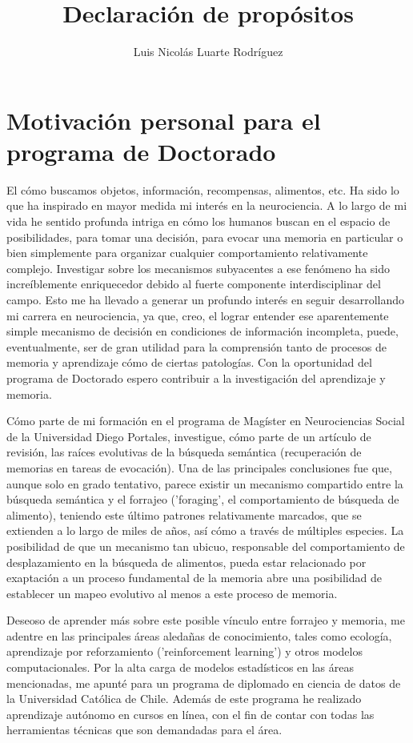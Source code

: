 \documentclass[11pt]{article}
\author{Luis Nicolás Luarte Rodríguez}
\date{}
\title{Declaración de propósitos}
\begin{document}
\maketitle
\section{Motivación personal para el programa de Doctorado}
\label{sec:org18057e2}
El cómo buscamos objetos, información, recompensas, alimentos, etc. Ha
sido lo que ha inspirado en mayor medida mi interés en la
neurociencia. A lo largo de mi vida he sentido profunda intriga en
cómo los humanos buscan en el espacio de posibilidades, para tomar una
decisión, para evocar una memoria en particular o bien simplemente
para organizar cualquier comportamiento relativamente complejo. Investigar
sobre los mecanismos subyacentes a ese fenómeno ha sido increíblemente
enriquecedor debido al fuerte componente interdisciplinar del campo.
Esto me ha llevado a generar un profundo interés en seguir
desarrollando mi carrera en neurociencia, ya que, creo, el lograr
entender ese aparentemente simple mecanismo de decisión en condiciones
de información incompleta, puede, eventualmente, ser de gran utilidad
para la comprensión tanto de procesos de memoria y aprendizaje cómo de
ciertas patologías. Con la oportunidad del programa de Doctorado
espero contribuir a la investigación del aprendizaje y memoria.

Cómo parte de mi formación en el programa de Magíster en Neurociencias
Social de la Universidad Diego Portales, investigue, cómo parte de un
artículo de revisión, las raíces evolutivas de la búsqueda semántica
(recuperación de memorias en tareas de evocación). Una de las
principales conclusiones fue que, aunque solo en grado tentativo,
parece existir un mecanismo compartido entre la búsqueda semántica y
el forrajeo ('foraging', el comportamiento de búsqueda de alimento),
teniendo este último patrones relativamente marcados, que se extienden
a lo largo de miles de años, así cómo a través de múltiples
especies. La posibilidad de que un mecanismo tan ubicuo, responsable
del comportamiento de desplazamiento en la búsqueda de alimentos, pueda estar
relacionado por exaptación a un proceso fundamental de la memoria abre una
posibilidad de establecer un mapeo evolutivo al menos a este proceso de memoria.

Deseoso de aprender más sobre este posible vínculo entre forrajeo y
memoria, me adentre en las principales áreas aledañas de conocimiento,
tales como ecología, aprendizaje por reforzamiento ('reinforcement
learning') y otros modelos computacionales. Por la alta carga de modelos
estadísticos en las áreas mencionadas, me apunté para un programa de
diplomado en ciencia de datos de la Universidad Católica de
Chile. Además de este programa he realizado aprendizaje autónomo en
cursos en línea, con el fin de contar con todas las herramientas
técnicas que son demandadas para el área.
\end{document}
